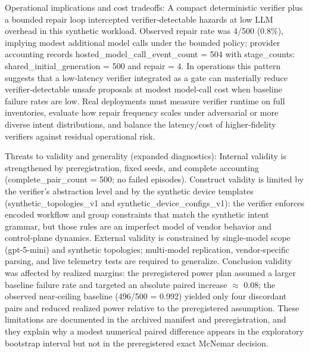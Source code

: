 \documentclass[conference]{IEEEtran}
\begin{document}
Operational implications and cost tradeoffs: A compact deterministic verifier plus a bounded repair loop intercepted verifier‑detectable hazards at low LLM overhead in this synthetic workload. Observed repair rate was 4/500 (0.8\%), implying modest additional model calls under the bounded policy; provider accounting records hosted\_model\_call\_event\_count = 504 with stage\_counts: shared\_initial\_generation = 500 and repair = 4. In operations this pattern suggests that a low‑latency verifier integrated as a gate can materially reduce verifier‑detectable unsafe proposals at modest model‑call cost when baseline failure rates are low. Real deployments must measure verifier runtime on full inventories, evaluate how repair frequency scales under adversarial or more diverse intent distributions, and balance the latency/cost of higher‑fidelity verifiers against residual operational risk.

Threats to validity and generality (expanded diagnostics): Internal validity is strengthened by preregistration, fixed seeds, and complete accounting (complete\_pair\_count = 500; no failed episodes). Construct validity is limited by the verifier's abstraction level and by the synthetic device templates (synthetic\_topologies\_v1 and synthetic\_device\_configs\_v1): the verifier enforces encoded workflow and group constraints that match the synthetic intent grammar, but those rules are an imperfect model of vendor behavior and control‑plane dynamics. External validity is constrained by single‑model scope (gpt-5-mini) and synthetic topologies; multi‑model replication, vendor‑specific parsing, and live telemetry tests are required to generalize. Conclusion validity was affected by realized margins: the preregistered power plan assumed a larger baseline failure rate and targeted an absolute paired increase \ensuremath{\approx} 0.08; the observed near‑ceiling baseline (496/500 = 0.992) yielded only four discordant pairs and reduced realized power relative to the preregistered assumption. These limitations are documented in the archived manifest and preregistration, and they explain why a modest numerical paired difference appears in the exploratory bootstrap interval but not in the preregistered exact McNemar decision.
\end{document}
